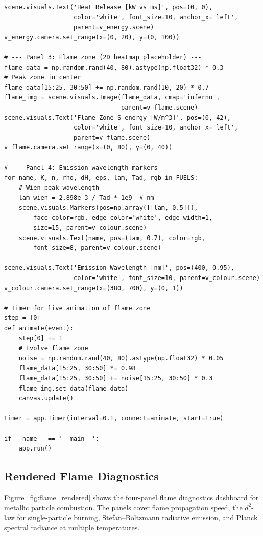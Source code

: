 \documentclass[11pt,a4paper]{article}
\begin{document}
\begin{lstlisting}[title={\textbf{Live Flame Speed \& Energy Dashboard}}]
scene.visuals.Text('Heat Release [kW vs ms]', pos=(0, 0),
                   color='white', font_size=10, anchor_x='left',
                   parent=v_energy.scene)
v_energy.camera.set_range(x=(0, 20), y=(0, 100))

# --- Panel 3: Flame zone (2D heatmap placeholder) ---
flame_data = np.random.rand(40, 80).astype(np.float32) * 0.3
# Peak zone in center
flame_data[15:25, 30:50] += np.random.rand(10, 20) * 0.7
flame_img = scene.visuals.Image(flame_data, cmap='inferno',
                                parent=v_flame.scene)
scene.visuals.Text('Flame Zone S_energy [W/m^3]', pos=(0, 42),
                   color='white', font_size=10, anchor_x='left',
                   parent=v_flame.scene)
v_flame.camera.set_range(x=(0, 80), y=(0, 40))

# --- Panel 4: Emission wavelength markers ---
for name, K, n, rho, dH, eps, lam, Tad, rgb in FUELS:
    # Wien peak wavelength
    lam_wien = 2.898e-3 / Tad * 1e9  # nm
    scene.visuals.Markers(pos=np.array([[lam, 0.5]]),
        face_color=rgb, edge_color='white', edge_width=1,
        size=15, parent=v_colour.scene)
    scene.visuals.Text(name, pos=(lam, 0.7), color=rgb,
        font_size=8, parent=v_colour.scene)

scene.visuals.Text('Emission Wavelength [nm]', pos=(400, 0.95),
                   color='white', font_size=10, parent=v_colour.scene)
v_colour.camera.set_range(x=(380, 700), y=(0, 1))

# Timer for live animation of flame zone
step = [0]
def animate(event):
    step[0] += 1
    # Evolve flame zone
    noise = np.random.rand(40, 80).astype(np.float32) * 0.05
    flame_data[15:25, 30:50] *= 0.98
    flame_data[15:25, 30:50] += noise[15:25, 30:50] * 0.3
    flame_img.set_data(flame_data)
    canvas.update()

timer = app.Timer(interval=0.1, connect=animate, start=True)

if __name__ == '__main__':
    app.run()
\end{lstlisting}

\subsection{Rendered Flame Diagnostics}

Figure~\ref{fig:flame_rendered} shows the four-panel flame diagnostics
dashboard for metallic particle combustion.  The panels cover flame
propagation speed, the $d^2$-law for single-particle burning, Stefan--Boltzmann
radiative emission, and Planck spectral radiance at multiple temperatures.
\end{document}
